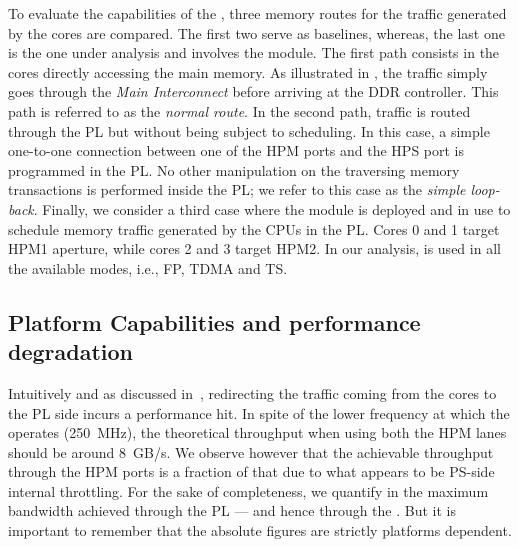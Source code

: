 
To evaluate the capabilities of the \schim, three memory routes for
the traffic generated by the cores are compared. The first two serve
as baselines, whereas, the last one is the one under analysis and
involves the \schim module.  The first path consists in the cores
directly accessing the main memory. As illustrated in
, the traffic simply goes through the
\emph{Main Interconnect} before arriving at the DDR controller. This
path is referred to as the \emph{normal route}. In the second path,
traffic is routed through the PL but without being subject to
scheduling. In this case, a simple one-to-one connection between one
of the HPM ports and the HPS port is programmed in the PL. No other
manipulation on the traversing memory transactions is performed inside
the PL; we refer to this case as the \emph{simple loop-back}. Finally,
we consider a third case where the \schim module is deployed and in
use to schedule memory traffic generated by the CPUs in the PL. Cores
0 and 1 target HPM1 aperture, while cores 2 and 3 target HPM2. In our
analysis, \schim is used in all the available modes, i.e., FP, TDMA
and TS.

\subsection{Platform Capabilities and performance degradation}
\label{subsec:platform-capabilities-and-performance-degradation}
Intuitively and as discussed in~\cite{PLIM20}, redirecting the traffic
coming from the cores to the PL side incurs a performance hit. In
spite of the lower frequency at which the \schim operates (250~MHz),
the theoretical throughput when using both the HPM lanes should be
around 8~GB/s. We observe however that the achievable throughput
through the HPM ports is a fraction of that due to what appears to be
PS-side internal throttling. For the sake of completeness, we quantify
in  the maximum bandwidth achieved
through the PL --- and hence through the \schim. But it is important
to remember that the absolute figures are strictly platforms
dependent.

